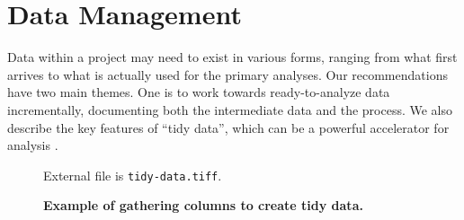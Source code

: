 \documentclass[10pt,letterpaper]{article}
\newcommand{\practicesection}[2]{\section{#1}\label{#2}}
\begin{document}
\practicesection{Data Management}{sec:data}

Data within a project may need to exist in various forms, ranging from
what first arrives to what is actually used for the primary analyses.
Our recommendations have two main themes. One is to work towards
ready-to-analyze data incrementally, documenting both the intermediate
data and the process. We also describe the key features of ``tidy
data'', which can be a powerful accelerator for analysis
\cite{wickham2014,hart2015}.

\begin{figure}
\caption{\textbf{Example of gathering columns to create tidy data.}}
External file is \texttt{tidy-data.tiff}.
\label{fig:tidy}
\end{figure}
\end{document}
